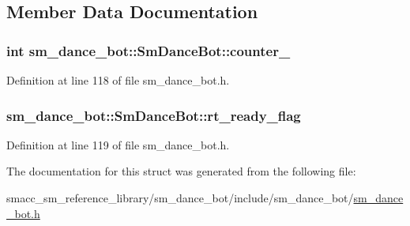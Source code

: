 \subsection{Member Data Documentation}
\subsubsection[{\texorpdfstring{counter\+\_\+1}{counter_1}}]{\setlength{\rightskip}{0pt plus 5cm}int sm\+\_\+dance\+\_\+bot\+::\+Sm\+Dance\+Bot\+::counter\+\_}\hypertarget{structsm__dance__bot_1_1SmDanceBot_ab3b8db557ce94d34c60b291911eb140c}{}\label{structsm__dance__bot_1_1SmDanceBot_ab3b8db557ce94d34c60b291911eb140c}


Definition at line 118 of file sm\+\_\+dance\+\_\+bot.\+h.

\subsubsection[{\texorpdfstring{rt\+\_\+ready\+\_\+flag}{rt_ready_flag}}]{ sm\+\_\+dance\+\_\+bot\+::\+Sm\+Dance\+Bot\+::rt\+\_\+ready\+\_\+flag}\hypertarget{structsm__dance__bot_1_1SmDanceBot_a0f0587a13670ad8925555cd8f6cb6b2d}{}\label{structsm__dance__bot_1_1SmDanceBot_a0f0587a13670ad8925555cd8f6cb6b2d}


Definition at line 119 of file sm\+\_\+dance\+\_\+bot.\+h.



The documentation for this struct was generated from the following file\+:\begin{DoxyCompactItemize}
\item 
smacc\+\_\+sm\+\_\+reference\+\_\+library/sm\+\_\+dance\+\_\+bot/include/sm\+\_\+dance\+\_\+bot/\hyperlink{sm__dance__bot_8h}{sm\+\_\+dance\+\_\+bot.\+h}\end{DoxyCompactItemize}
